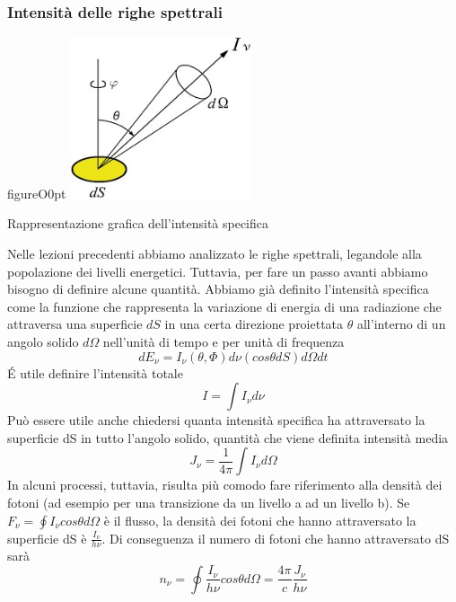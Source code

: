 \documentclass[a4paper,11pt]{article}
\begin{document}
\subsubsection{Intensità delle righe spettrali}
\begin{wrapfloat}{figure}{O}{0pt}
	\includegraphics[width=0.40\textwidth, height=0.20\textheight]{rappresentazione.jpg}
	\caption{\footnotesize Rappresentazione grafica dell'intensità specifica}
	\end{wrapfloat}
Nelle lezioni precedenti abbiamo analizzato le righe spettrali, legandole alla popolazione dei livelli energetici. Tuttavia, per fare un passo avanti abbiamo bisogno di definire alcune quantità. Abbiamo già definito l'intensità specifica come la funzione che rappresenta la variazione di energia di una radiazione che attraversa una superficie \(dS\) in una certa direzione proiettata \(\theta\) all'interno di un angolo solido \(d\Omega\) nell'unità di tempo e per unità di frequenza 
\[dE_\nu=I_\nu(\theta,\Phi)d\nu (cos\theta dS) d\Omega dt\]
É utile definire l'intensità totale 
\[I= \int I_\nu d\nu\]
Può essere utile anche chiedersi quanta intensità specifica ha attraversato la superficie dS in tutto l'angolo solido, quantità che viene definita intensità media 
\[J_\nu = \frac{1}{4\pi}\int I_\nu d\Omega\]
In alcuni processi, tuttavia, risulta più comodo fare riferimento alla densità dei fotoni (ad esempio per una transizione da un livello a ad un livello b). Se \(F_\nu =\oint I_\nu cos\theta d\Omega \)  è il flusso, la densità dei fotoni che hanno attraversato la superficie dS è \(\frac{I_\nu}{h\nu}\). Di conseguenza il numero di fotoni che hanno attraversato dS sarà
\[n_\nu = \oint \frac{I_\nu}{h\nu}cos\theta d\Omega= \frac{4\pi}{c}\frac{J_\nu}{h\nu}\]
\end{document}
